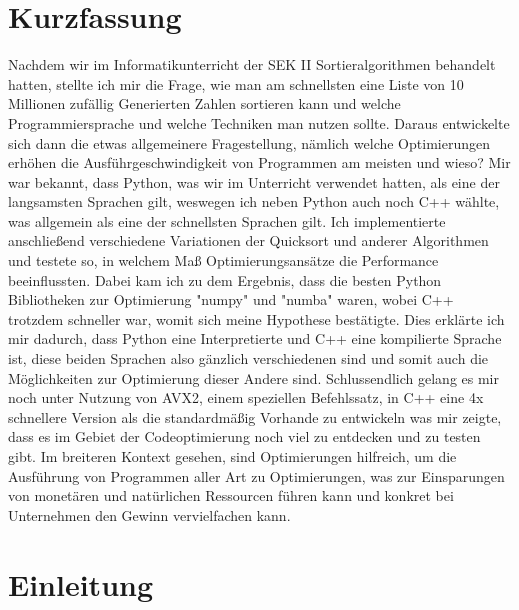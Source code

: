 \documentclass[12pt,a4paper]{article}
\begin{document}
\section*{Kurzfassung}
Nachdem wir im Informatikunterricht der SEK II Sortieralgorithmen behandelt hatten,
stellte ich mir die Frage, wie man am schnellsten eine Liste von 10 Millionen zufällig Generierten Zahlen
sortieren kann und welche Programmiersprache und welche Techniken man nutzen sollte.
Daraus entwickelte sich dann die etwas allgemeinere Fragestellung, 
nämlich welche Optimierungen erhöhen die Ausführgeschwindigkeit von Programmen am meisten und wieso?
Mir war bekannt, dass Python, was wir im Unterricht verwendet hatten, als eine der langsamsten Sprachen gilt, 
weswegen ich neben Python auch noch C++ wählte, was allgemein als eine der schnellsten Sprachen gilt.
Ich implementierte anschließend verschiedene Variationen der Quicksort und anderer Algorithmen und testete so, 
in welchem Maß Optimierungsansätze die Performance beeinflussten.
Dabei kam ich zu dem Ergebnis, dass die besten Python Bibliotheken zur Optimierung "numpy" und "numba" waren,
wobei C++ trotzdem schneller war, womit sich meine Hypothese bestätigte.
Dies erklärte ich mir dadurch, dass Python eine Interpretierte und C++ eine kompilierte Sprache ist, diese
beiden Sprachen also gänzlich verschiedenen sind und somit auch die Möglichkeiten zur Optimierung dieser Andere sind.
Schlussendlich gelang es mir noch unter Nutzung von AVX2, einem speziellen Befehlssatz, in C++ eine 4x schnellere Version als die standardmäßig 
Vorhande zu entwickeln was mir zeigte, dass es im Gebiet der Codeoptimierung noch viel zu entdecken und zu
testen gibt.
Im breiteren Kontext gesehen, sind Optimierungen hilfreich, um die Ausführung von Programmen aller Art zu Optimierungen,
was zur Einsparungen von monetären und natürlichen Ressourcen führen kann und konkret bei Unternehmen den Gewinn
vervielfachen kann.

\clearpage
\renewcommand*\contentsname{Inhaltsverzeichnis}
\tableofcontents

\clearpage

\section{Einleitung}
\end{document}
